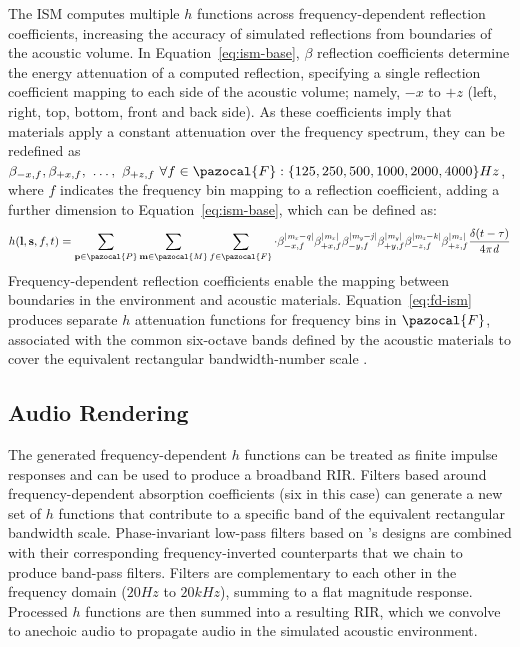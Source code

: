 The ISM computes multiple $h$ functions across frequency-dependent reflection coefficients, increasing the accuracy of simulated reflections from boundaries of the acoustic volume. In Equation~\ref{eq:ism-base}, $\beta$ reflection coefficients determine the energy attenuation of a computed reflection, specifying a single reflection coefficient mapping to each side of the acoustic volume; namely, $-x$ to $+z$  (left, right, top, bottom, front and back side). As these coefficients imply that materials apply a constant attenuation over the frequency spectrum, they can be redefined as $\beta_{-x,f}, \beta_{+x,f},~\dots, ~\beta_{+z,f}~\forall f \in \pazocal{F}: \{125, 250, 500, 1000, 2000, 4000\} Hz$, where $f$ indicates the frequency bin mapping to a reflection coefficient, adding a further dimension to Equation~\ref{eq:ism-base}, which can be defined as:
\begin{equation}\label{eq:fd-ism}    
 h(\mathbf{l}, \mathbf{s}, f, t) = \sum_{\mathbf{p} \in \pazocal{P}} \sum_{\mathbf{m} \in \pazocal{M}} \sum_{f \in \pazocal{F}}\cdot
\beta_{ {-x,f } }^{|\mathit{m_x - q}|} \beta_{+x, f }^{|\mathit{m_x}|} \beta_{ -y,f}^{|\mathit{m_y - j}|} \beta_{ +y, f }^{|\mathit{m_y}|} \beta_{ -z, f }^{|\mathit{m_z - k}|} \beta_{ +z, f }^{|\mathit{m_z}|} \frac{\delta(t - \tau)}{4\pi \mathit{d}}
\end{equation}
Frequency-dependent reflection coefficients enable the mapping between boundaries in the environment and acoustic materials. Equation~\ref{eq:fd-ism} produces separate $h$ attenuation functions for frequency bins in $\pazocal{F}$, associated with the common six-octave bands defined by the acoustic materials to cover the equivalent rectangular bandwidth-number scale \citep{kuttruff2016room, savioja2015overview}.

\subsection{Audio Rendering}
The generated frequency-dependent $h$ functions can be treated as finite impulse responses and can be used to produce a broadband RIR. Filters based around frequency-dependent absorption coefficients (six in this case) can generate a new set of $h$ functions that contribute to a specific band of the equivalent rectangular bandwidth scale. Phase-invariant low-pass filters based on \citep{smith1997scientist}'s designs are combined with their corresponding frequency-inverted counterparts that we chain to produce band-pass filters. Filters are complementary to each other in the frequency domain ($20Hz$ to $20kHz$), summing to a flat magnitude response. Processed $h$ functions are then summed into a resulting RIR, which we convolve to anechoic audio to propagate audio in the simulated acoustic environment. \par

